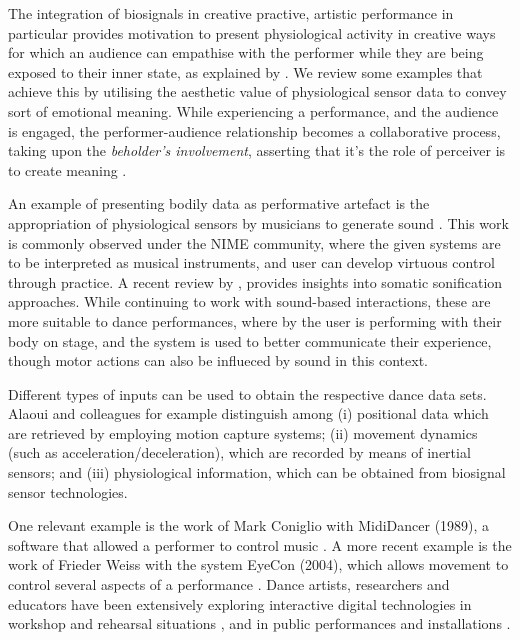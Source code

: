 The integration of biosignals in creative practive, artistic performance in particular provides motivation to present physiological activity in creative ways for which an audience can empathise with the performer while they are being exposed to their inner state, as explained by \citeauthor{francoise_designing_2017} \cite{francoise_designing_2017}. We review some examples that achieve this by utilising the aesthetic value of physiological sensor data to convey sort of emotional meaning. While experiencing a performance, and the audience is engaged, the performer-audience relationship becomes a collaborative process, taking upon the \textit{beholder's involvement}, asserting that it's the role of perceiver is to create meaning \cite{kandel_age_2012}.

An example of presenting bodily data as performative artefact is the appropriation of physiological sensors by musicians to generate sound \cite{aly_appropriating_2021}.
This work is commonly observed under the NIME community, where the given systems are to be interpreted as musical instruments, and user can develop virtuous control through practice. A recent review by \citeauthor{giomi_somatic_2020}, provides insights into somatic sonification approaches. While continuing to work with sound-based interactions, these are more suitable to dance performances, where by the user is performing with their body on stage, and the system is used to better communicate their experience, though motor actions can also be influeced by sound in this context.

Different types of inputs can be used to obtain the respective dance data sets. Alaoui and colleagues \cite{fdili2017seeing} for example distinguish among (i) positional data which are retrieved by employing motion capture systems; (ii) movement dynamics (such as acceleration/deceleration), which are recorded by means of inertial sensors; and (iii) physiological information, which can be obtained from biosignal sensor technologies.

One relevant example is the work of Mark Coniglio with MidiDancer (1989), a software that allowed a performer to control music \cite{Troikaranch}. A more recent example is the work of Frieder Weiss with the system EyeCon (2004), which allows movement to control several aspects of a performance \cite{wechsler2004eyecon}. Dance artists, researchers and educators have been extensively exploring interactive digital technologies in workshop and rehearsal situations \cite{dinkla2002dance}, and in public performances and installations \cite{latulipe2010exploring}.

